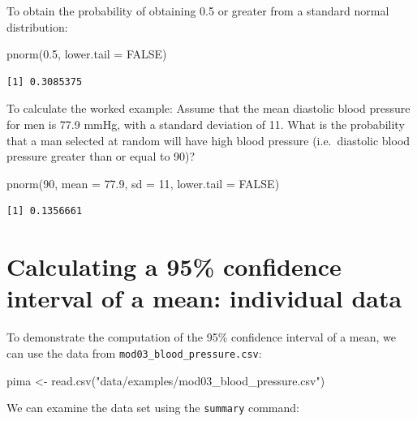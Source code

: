\documentclass[
  a4paper,
]{memoir}
\newenvironment{Shaded}{\begin{snugshade}}{\end{snugshade}}
\newcommand{\AttributeTok}[1]{\textcolor[rgb]{0.00,0.00,0.00}{#1}}
\newcommand{\ConstantTok}[1]{\textcolor[rgb]{0.00,0.00,0.00}{#1}}
\newcommand{\DecValTok}[1]{\textcolor[rgb]{0.00,0.00,0.00}{#1}}
\newcommand{\FloatTok}[1]{\textcolor[rgb]{0.00,0.00,0.00}{#1}}
\newcommand{\FunctionTok}[1]{\textcolor[rgb]{0.00,0.00,0.00}{#1}}
\newcommand{\NormalTok}[1]{\textcolor[rgb]{0.00,0.00,0.00}{#1}}
\newcommand{\OtherTok}[1]{\textcolor[rgb]{0.00,0.00,0.00}{#1}}
\newcommand{\StringTok}[1]{\textcolor[rgb]{0.00,0.00,0.00}{#1}}
\begin{document}
To obtain the probability of obtaining 0.5 or greater from a standard
normal distribution:

\begin{Shaded}
\begin{Highlighting}[]
\FunctionTok{pnorm}\NormalTok{(}\FloatTok{0.5}\NormalTok{, }\AttributeTok{lower.tail =} \ConstantTok{FALSE}\NormalTok{)}
\end{Highlighting}
\end{Shaded}

\begin{verbatim}
[1] 0.3085375
\end{verbatim}

To calculate the worked example: Assume that the mean diastolic blood
pressure for men is 77.9 mmHg, with a standard deviation of 11. What is
the probability that a man selected at random will have high blood
pressure (i.e.~diastolic blood pressure greater than or equal to 90)?

\begin{Shaded}
\begin{Highlighting}[]
\FunctionTok{pnorm}\NormalTok{(}\DecValTok{90}\NormalTok{, }\AttributeTok{mean =} \FloatTok{77.9}\NormalTok{, }\AttributeTok{sd =} \DecValTok{11}\NormalTok{, }\AttributeTok{lower.tail =} \ConstantTok{FALSE}\NormalTok{)}
\end{Highlighting}
\end{Shaded}

\begin{verbatim}
[1] 0.1356661
\end{verbatim}

\section{Calculating a 95\% confidence interval of a mean: individual
data}\label{sec-cimean-r-ind}

To demonstrate the computation of the 95\% confidence interval of a
mean, we can use the data from \texttt{mod03\_blood\_pressure.csv}:

\begin{Shaded}
\begin{Highlighting}[]
\NormalTok{pima }\OtherTok{\textless{}{-}} \FunctionTok{read.csv}\NormalTok{(}\StringTok{"data/examples/mod03\_blood\_pressure.csv"}\NormalTok{)}
\end{Highlighting}
\end{Shaded}

We can examine the data set using the \texttt{summary} command:
\end{document}
